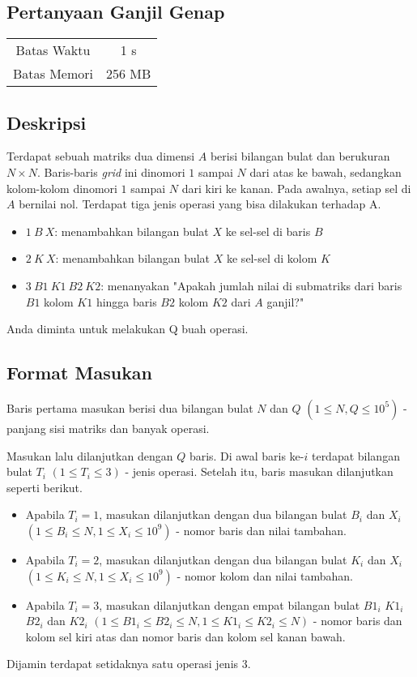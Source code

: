 \documentclass{article}
\begin{document}
\begin{center}
    \section*{Pertanyaan Ganjil Genap} %

    \begin{tabular}{ | c c | }
        \hline
        Batas Waktu  & 1 s \\    %
        Batas Memori & 256 MB \\  %
        \hline
    \end{tabular}
\end{center}

\subsection*{Deskripsi}
Terdapat sebuah matriks dua dimensi $A$ berisi bilangan bulat dan berukuran $N \times N$. Baris-baris \textit{grid} ini dinomori $1$ sampai $N$ dari atas ke bawah, sedangkan kolom-kolom dinomori $1$ sampai $N$ dari kiri ke kanan. Pada awalnya, setiap sel di $A$ bernilai nol. Terdapat tiga jenis operasi yang bisa dilakukan terhadap A.
\begin{itemize}
    \item $1\ B\ X$: menambahkan bilangan bulat $X$ ke sel-sel di baris $B$
    \item $2\ K\ X$: menambahkan bilangan bulat $X$ ke sel-sel di kolom $K$
    \item $3\ B1\ K1\ B2\ K2$: menanyakan "Apakah jumlah nilai di submatriks dari baris $B1$ kolom $K1$ hingga baris $B2$ kolom $K2$ dari $A$ ganjil?"
\end{itemize}
Anda diminta untuk melakukan Q buah operasi.

\subsection*{Format Masukan}
Baris pertama masukan berisi dua bilangan bulat $N$ dan $Q$ $(1 \leq N, Q \leq 10^5)$ - panjang sisi matriks dan banyak operasi.

Masukan lalu dilanjutkan dengan $Q$ baris. Di awal baris ke-$i$ terdapat bilangan bulat $T_i$ $(1 \leq T_i \leq 3)$ - jenis operasi. Setelah itu, baris masukan dilanjutkan seperti berikut.
\begin{itemize}
    \item Apabila $T_i = 1$, masukan dilanjutkan dengan dua bilangan bulat $B_i$ dan $X_i$ $(1 \leq B_i \leq N, 1 \leq X_i \leq 10^9)$ - nomor baris dan nilai tambahan.
    \item Apabila $T_i = 2$, masukan dilanjutkan dengan dua bilangan bulat $K_i$ dan $X_i$ $(1 \leq K_i \leq N, 1 \leq X_i \leq 10^9)$ - nomor kolom dan nilai tambahan.
    \item Apabila $T_i = 3$, masukan dilanjutkan dengan empat bilangan bulat $B1_{i}$ $K1_{i}$ $B2_{i}$ dan $K2_{i}$ $(1 \leq B1_i \leq B2_i \leq N, 1 \leq K1_i \leq K2_i \leq N)$ - nomor baris dan kolom sel kiri atas dan nomor baris dan kolom sel kanan bawah.
\end{itemize}
Dijamin terdapat setidaknya satu operasi jenis $3$.
\end{document}
